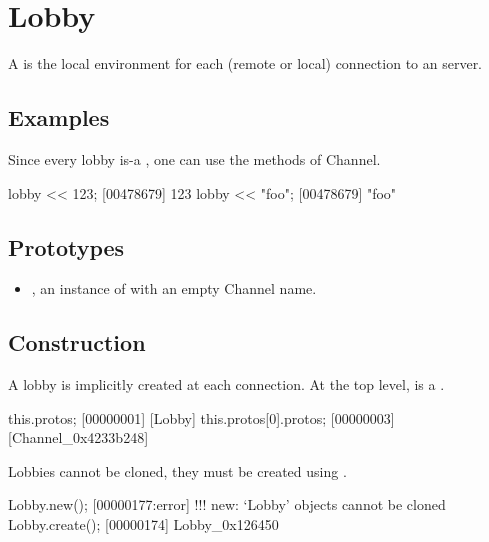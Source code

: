
\section{Lobby}

A  is the local environment for each (remote or local)
connection to an \urbi server.

\subsection{Examples}

Since every lobby is-a , one can use the methods of
Channel.

\begin{urbiscript}
lobby << 123;
[00478679] 123
lobby << "foo";
[00478679] "foo"
\end{urbiscript}

\subsection{Prototypes}
\begin{itemize}
\item {}, an instance of 
  with an empty Channel name.
\end{itemize}

\subsection{Construction}

A lobby is implicitly created at each connection. At the top level,
\this is a .

\begin{urbiscript}
this.protos;
[00000001] [Lobby]
this.protos[0].protos;
[00000003] [Channel_0x4233b248]
\end{urbiscript}

Lobbies cannot be cloned, they must be created using .

\begin{urbiscript}
Lobby.new();
[00000177:error] !!! new: `Lobby' objects cannot be cloned
Lobby.create();
[00000174] Lobby_0x126450
\end{urbiscript}


